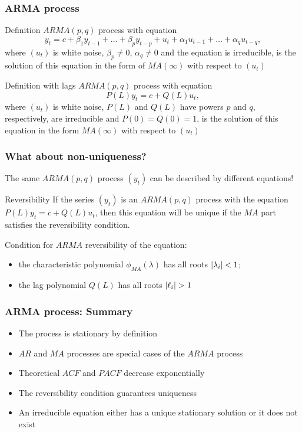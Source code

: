 \begin{frame}
	\frametitle{ARMA process}
	
	\begin{block}{Definition}
		$ARMA(p, q)$ process with equation
		\[
		y_t = c + \beta_1 y_{t-1} + \ldots + \beta_p y_{t-p} + u_t + \alpha_1 u_{t-1} + \ldots + \alpha_q u_{t-q},
		\]
		where $(u_t)$ is white noise, $\beta_p \neq 0$, $\alpha_q \neq 0$ and the equation is irreducible, is the
		solution of this equation in the form of $MA(\infty)$ with respect to $(u_t)$
	\end{block}
	
	\pause
	\begin{block}{Definition with lags}
		$ARMA(p,q)$ process with equation
		\[
		P(L)y_t = c + Q(L)u_t,
		\]
		where $(u_t)$ is white noise, $P(L)$ and $Q(L)$ have powers $p$ and $q$, respectively, are irreducible and $P(0)=Q(0)=1$, is 	the solution of this equation in  the form $MA(\infty)$ with respect to $(u_t)$
	\end{block}
\end{frame}


\begin{frame}
	\frametitle{What about non-uniqueness?}
	
	The same $ARMA(p, q)$ process $(y_t)$ can be described by different equations!
	\pause
	
	\begin{block}{Reversibility}
		If the series $(y_t)$ is an $ARMA(p, q)$ process with the equation $P(L) y_t = c + Q(L) u_t$,
		then this equation will be unique if the $MA$ part satisfies the reversibility condition.
	\end{block}
	
	\pause
	Condition for $ARMA$ reversibility of the equation:
	\begin{itemize}
		\item the characteristic polynomial $\phi_{MA}(\lambda)$ has all roots $\abs{\lambda_i} <1$;
		\item the lag polynomial $Q(L)$ has all roots $\abs{\ell_i} >1$
	\end{itemize}
	
	
\end{frame}



\begin{frame}
	\frametitle{ARMA process: Summary}
	\begin{itemize}[<+->]
		\item The process is stationary by \alert{definition}
		\item $AR$ and $MA$ processes are \alert{special cases} of the $ARMA$ process
		\item Theoretical $ACF$ and $PACF$ decrease \alert{exponentially}
		\item The reversibility condition guarantees \alert{uniqueness}
		\item An irreducible equation either has a \alert{unique} stationary solution  or it does not exist
	\end{itemize}
\end{frame}